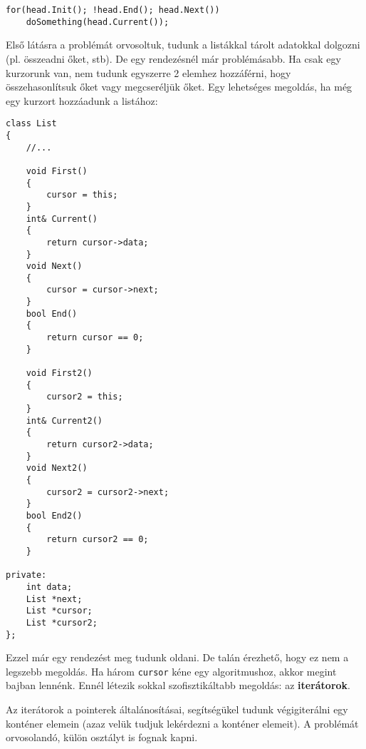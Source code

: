 \documentclass[a4paper,11.5pt,table]{article}
\begin{document}
\begin{lstlisting}
for(head.Init(); !head.End(); head.Next())
	doSomething(head.Current());
\end{lstlisting}
	Első látásra a problémát orvosoltuk, tudunk a listákkal tárolt adatokkal dolgozni (pl. összeadni őket, stb). De egy rendezésnél már problémásabb. Ha csak egy kurzorunk van, nem tudunk egyszerre 2 elemhez hozzáférni, hogy összehasonlítsuk őket vagy megcseréljük őket. Egy lehetséges megoldás, ha még egy kurzort hozzáadunk a listához:
\begin{lstlisting}
class List
{
	//...
	
	void First()
	{
		cursor = this;
	}
	int& Current()
	{
		return cursor->data;
	}
	void Next()
	{
		cursor = cursor->next;
	}	
	bool End()
	{
		return cursor == 0;
	}
	
	void First2()
	{
		cursor2 = this;
	}
	int& Current2()
	{
		return cursor2->data;
	}
	void Next2()
	{
		cursor2 = cursor2->next;
	}	
	bool End2()
	{
		return cursor2 == 0;
	}
	
private:
	int data;
	List *next;
	List *cursor;
	List *cursor2;
};
\end{lstlisting}
	Ezzel már egy rendezést meg tudunk oldani. De talán érezhető, hogy ez nem a legszebb megoldás. Ha három \texttt{cursor} kéne egy algoritmushoz, akkor megint bajban lennénk. Ennél létezik sokkal szofisztikáltabb megoldás: az \textbf{iterátorok}.
	
	Az iterátorok a pointerek általánosításai, segítségükel tudunk végigiterálni egy konténer elemein (azaz velük tudjuk lekérdezni a konténer elemeit). A problémát orvosolandó, külön osztályt is fognak kapni.
	
\end{document}
